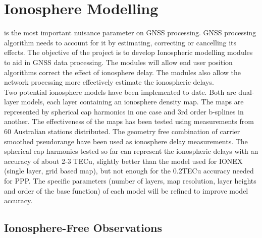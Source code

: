\chapter{Ionosphere Modelling}
\label{ch:ionosphere_modelling}
\begin{fullwidth}
 is the most important nuisance parameter on GNSS processing. 
GNSS processing algorithm needs to account for it by estimating, correcting or cancelling its effects. The objective of the project is to develop Ionospheric modelling modules to aid in GNSS data processing. The modules will allow end user position algorithms correct the effect of ionosphere delay. The modules also allow the network processing more effectively estimate the ionospheric delays.\\
%
Two potential ionosphere models have been implemented to date. Both are dual-layer models, each layer containing an ionosphere density map. The maps are represented by spherical cap harmonics in one case and 3rd order b-splines in another. The effectiveness of the maps has been tested using measurements from 60 Australian stations distributed. The geometry free combination of carrier smoothed pseudorange have been used as ionosphere delay measurements. The spherical cap harmonics tested so far can represent the ionospheric delays with an accuracy of about 2-3 TECu, slightly better than the model used for IONEX (single layer, grid based map), but not enough for the 0.2TECu accuracy needed for PPP. The specific parameters (number of layers, map resolution, layer heights and order of the base function) of each model will be refined to improve model accuracy.\\
%
\end{fullwidth}
\section{Ionosphere-Free Observations}
